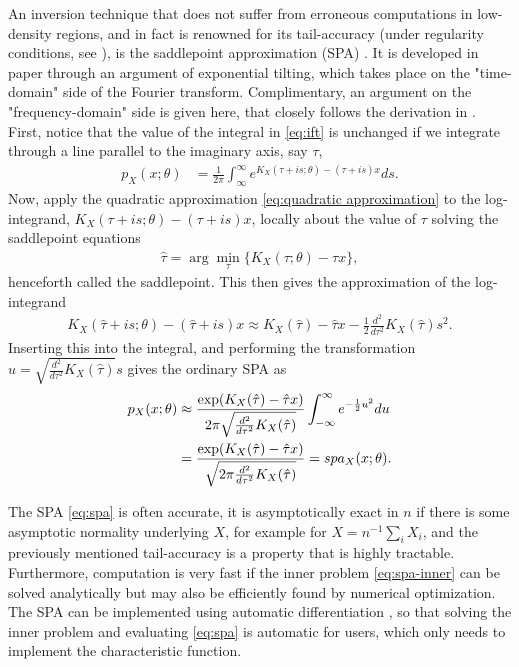 An inversion technique that does not suffer from erroneous computations in low-density regions, and in fact is renowned for its tail-accuracy (under regularity conditions, see \citet{barndorff1999tail}), is the saddlepoint approximation (SPA) \citep{daniels1954saddlepoint}.
It is developed in paper  through an argument of exponential tilting, which takes place on the "time-domain" side of the Fourier transform. 
Complimentary, an argument on the "frequency-domain" side is given here, that closely follows the derivation in \citet{butler2007saddlepoint}.
First, notice that the value of the integral in \eqref{eq:ift} is unchanged if we integrate through a line parallel to the imaginary axis, say $\tau$,
\begin{align}
	p_X(x;\theta) 
	&= \frac{1}{2\pi} \int_{\infty}^{\infty} e^{K_X(\tau+is;\theta)-(\tau+is)x} ds.
\end{align}
Now, apply the quadratic approximation \eqref{eq:quadratic approximation} to the log-integrand,
$K_X(\tau+is;\theta)-(\tau+is)x$,
locally about the value of $\tau$ solving the saddlepoint equations
\begin{align}\label{eq:spa-inner}
	\hat{\tau}=\arg\min_\tau\{ K_X(\tau;\theta)-\tau x\},
\end{align}
henceforth called the saddlepoint.
This then gives the approximation of the log-integrand
\begin{align}
	K_X(\hat{\tau}+is;\theta)-(\hat{\tau}+is)x
	\approx 
	K_X(\hat{\tau})-\hat{\tau}x
	- \frac{1}{2}\frac{d^2}{d\tau^2}K_X(\hat{\tau})s^2.
\end{align}
Inserting this into the integral, and performing the transformation $u=\sqrt{\frac{d^2}{d\tau^2}K_X(\hat{\tau})}s$ gives the ordinary SPA as
\begin{align}\label{eq:spa}
	p_X(x;\theta) 
	&\approx
	\frac{\exp(K_X(\hat{\tau})-\hat{\tau}x)}{2\pi\sqrt{\frac{d^2}{d\tau^2}K_X(\hat{\tau})}}
	\int_{-\infty}^{\infty}e^{-\frac{1}{2}u^2}du \notag \\
	&= \frac{\exp(K_X(\hat{\tau})-\hat{\tau}x)}{\sqrt{2\pi\frac{d^2}{d\tau^2}K_X(\hat{\tau})}}
	= spa_X(x;\theta).
\end{align}

The SPA \eqref{eq:spa} is often accurate, it is asymptotically exact in $n$ if there is some asymptotic normality underlying $X$, for example for $X=n^{-1}\sum_i X_i$, and
the previously mentioned tail-accuracy is a property that is highly tractable.
Furthermore, computation is very fast if the inner problem \eqref{eq:spa-inner} can be solved 
analytically but may also be efficiently found by numerical optimization.
The SPA can be implemented using automatic differentiation \citep{griewank2008evaluating}, so that
solving the inner problem and evaluating \eqref{eq:spa} is automatic for users, which only needs to implement the characteristic function.

